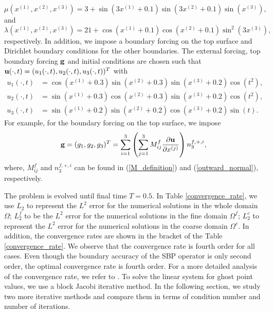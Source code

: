 \begin{equation*}\label{mu_function}
\mu(x^{(1)},x^{(2)},x^{(3)}) = 3 + \sin(3x^{(1)}+0.1)\sin(3x^{(2)}+0.1)\sin(x^{(3)}),
\end{equation*}
and 
\begin{equation*}\label{lambda_function}
\lambda(x^{(1)},x^{(2)},x^{(3)})  = 21+ \cos(x^{(1)}+0.1)\cos(x^{(2)}+0.1)\sin^2(3x^{(3)}),
\end{equation*}
respectively. In addition, we impose a boundary forcing on the top surface and Dirichlet boundary conditions for the other boundaries. The external forcing, top boundary forcing ${\bf g}$ and initial conditions are chosen such that ${\bf u}(\cdot,t) = (u_1(\cdot,t),u_2(\cdot,t),u_3(\cdot,t))^T$ with
\begin{align*}
u_1(\cdot,t) &= \cos(x^{(1)}+0.3)\sin(x^{(2)}+0.3)\sin(x^{(3)}+0.2)\cos(t^2),\\
u_2(\cdot,t) &= \sin(x^{(1)}+0.3)\cos(x^{(2)}+0.3)\sin(x^{(3)}+0.2)\cos(t^2),\\
u_3(\cdot,t) &= \sin(x^{(1)}+0.2)\sin(x^{(2)}+0.2)\cos(x^{(3)}+0.2)\sin(t).
\end{align*}
For example, for the boundary forcing on the top surface, we impose 
\begin{equation*}\label{traction_force}
{\bf g} = (g_1,g_2,g_3)^T = \sum_{i=1}^3\left(\sum_{j = 1}^3 M_{ij}^f\frac{\partial{\bf u}}{\partial x^{(j)}}\right) n^{f,+,i}_3,
\end{equation*}
where, $M_{ij}^f$ and $n^{f,+,i}_3 $ can be found in (\ref{M_definition}) and (\ref{outward_normal}), respectively.

The problem is evolved until final time $T = 0.5$. In Table \ref{convergence_rate}, we use $L_2$ to represent the $L^2$ error for the numerical solutions in the whole domain $\Omega$; $L_2^f$ to be the $L^2$ error for the numerical solutions in the fine domain $\Omega^f$; $L_2^c$ to represent the $L^2$ error for the numerical solutions in the coarse domain $\Omega^c$. In addition, the convergence rates are shown in the bracket of the Table \ref{convergence_rate}. We observe that the convergence rate is fourth order for all cases. Even though the boundary accuracy of the SBP operator is only second order, the optimal convergence rate is fourth order. For a more detailed analysis of the convergence rate, we refer to \cite{Wang2017, Wang2018b}.  To solve the linear system for ghost point values, we use a block Jacobi iterative method. In the following section, we study two more iterative methods and compare them in terms of condition number and number of iterations.

